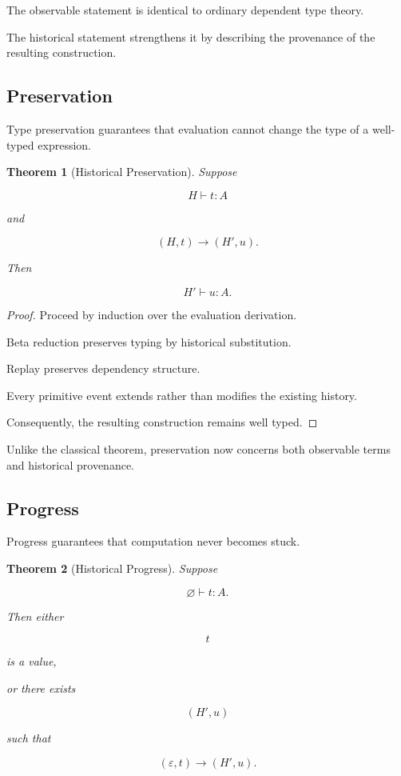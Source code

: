 \documentclass[12pt,oneside]{article}
\newtheorem{theorem}{Theorem}[section]
\theoremstyle{definition}
\theoremstyle{remark}
\begin{document}
The observable statement is identical to ordinary dependent type theory.

The historical statement strengthens it by describing the provenance of the
resulting construction.

\subsection{Preservation}

Type preservation guarantees that evaluation cannot change the type of a
well-typed expression.

\begin{theorem}[Historical Preservation]

Suppose

\[
H
\vdash
t:A
\]

and

\[
(H,t)
\longrightarrow
(H',u).
\]

Then

\[
H'
\vdash
u:A.
\]

\end{theorem}

\begin{proof}

Proceed by induction over the evaluation derivation.

Beta reduction preserves typing by historical substitution.

Replay preserves dependency structure.

Every primitive event extends rather than modifies the existing history.

Consequently, the resulting construction remains well typed.

\end{proof}

Unlike the classical theorem, preservation now concerns both observable terms
and historical provenance.

\subsection{Progress}

Progress guarantees that computation never becomes stuck.

\begin{theorem}[Historical Progress]

Suppose

\[
\varnothing
\vdash
t:A.
\]

Then either

\[
t
\]

is a value,

or there exists

\[
(H',u)
\]

such that

\[
(\varepsilon,t)
\longrightarrow
(H',u).
\]

\end{theorem}
\end{document}
